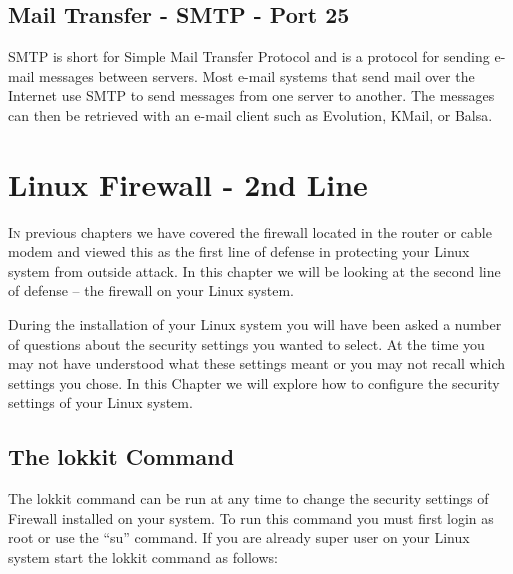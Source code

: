 \subsection{Mail Transfer - SMTP - Port 25}
\label{ssec:mail_transfer_smtp_port_25}

SMTP is short for Simple Mail Transfer Protocol and is  a protocol for sending
e-mail messages between servers. Most e-mail systems that send mail over the
Internet use SMTP to send messages from one server to another. The messages can
then be retrieved with an e-mail client such as Evolution, KMail, or Balsa.



\subsectionend

\sectionend

\section{{Linux Firewall - 2nd Line}}
\label{sec:linux_firewall_2nd_line}

\lettrine[lines=3, findent=3pt, nindent=0pt]{I}{n} previous chapters we have
covered the firewall located in the router or cable modem and viewed this as the
first line of defense in protecting your Linux system from outside attack. In
this chapter we will be looking at the second line of defense – the firewall on
your Linux system. 



During the installation of your Linux system you will have been asked a number
of questions about the security settings you wanted to select. At the time you
may not have understood what these settings meant or you may not recall which
settings you chose. In  this Chapter we will explore how to configure the
security settings of your Linux system.



\subsection{The lokkit Command}
\label{ssec:the_lokkit_command}

The lokkit command can be run at any time to change the security settings of
Firewall installed on your system. To run this command you must first login as
root or use the “su” command. If you are already super user on your Linux system
start the lokkit command as follows:



